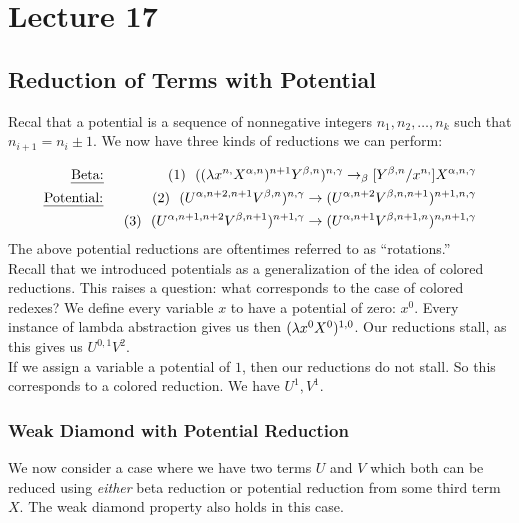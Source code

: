 \chapter{Lecture 17}

\section{Reduction of Terms with Potential}
Recal that a potential is a sequence of nonnegative integers $n_1,n_2,\ldots,n_k$ such that $n_{i+1} = n_i \pm 1$. We now have three kinds of reductions we can perform:

\begin{eqnarray*}
  &\hbox{\hspace{.27in}\uline{Beta:} }& (1)\ \ ((\l x^{n,} X^{\alpha,n})^{n+1}Y^{\beta,n})^{n,\gamma} \rightarrow_\beta [Y^{\beta,n}/x^{n,}]X^{\alpha,n,\gamma}\\
  &\hbox{\uline{Potential:} }& (2)\ \ (U^{\alpha,n+2,n+1} V^{\beta,n})^{n,\gamma} \rightarrow (U^{\alpha,n+2} V^{\beta,n,n+1})^{n+1,n,\gamma}\\
  && (3)\ \ (U^{\alpha, n+1, n+2} V^{\beta,n+1})^{n+1, \gamma} \rightarrow (U^{\alpha, n+1} V^{\beta,n+1,n})^{n,n+1,\gamma}
\end{eqnarray*}
The above potential reductions are oftentimes referred to as ``rotations.''\\

Recall that we introduced potentials as a generalization of the idea of colored reductions. This raises a question: what corresponds to the case of colored redexes? We define every variable $x$ to have a potential of zero: $x^0$. Every instance of lambda abstraction gives us then $(\lambda x^0X^0)^{1,0}$. Our reductions stall, as this gives us $U^{0,1}V^2$.\\

If we assign a variable a potential of $1$, then our reductions do not stall. So this corresponds to a colored reduction. We have $U^1,V^1$.

\subsection{Weak Diamond with Potential Reduction}
We now consider a case where we have two terms $U$ and $V$ which both can be reduced using \textit{either} beta reduction or potential reduction from some third term $X$. The weak diamond property also holds in this case.
\begin{center}
\end{center}

